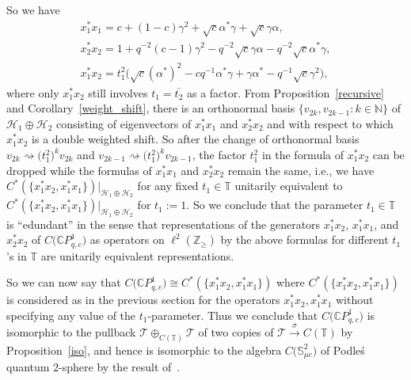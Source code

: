 So we have
\begin{gather*}
x_{1}^{\ast}x_{1} =c+(1-c) \gamma^{2}+\sqrt{c}\alpha^{\ast
}\gamma+\sqrt{c}\gamma\alpha,\\
x_{2}^{\ast}x_{2} =1+q^{-2}(c-1) \gamma^{2}-q^{-2}\sqrt
{c}\gamma\alpha-q^{-2}\sqrt{c}\alpha^{\ast}\gamma,\\
x_{1}^{\ast}x_{2} =t_{1}^{2}\big( \sqrt{c} ( \alpha^{\ast} )
^{2}-cq^{-1}\alpha^{\ast}\gamma+\gamma\alpha^{\ast}-q^{-1}\sqrt{c}\gamma
^{2}\big) ,
\end{gather*}
where only $x_{1}^{\ast}x_{2}$ still involves $t_{1}=\overline{t_{2}}$ as a
factor. From Proposition~\ref{recursive} and Corollary~\ref{weight_shift}, there is an orthonormal
basis $ \{ v_{2k},v_{2k-1}\colon k\in\mathbb{N} \} $ of $\mathcal{H}%
_{1}\oplus\mathcal{H}_{2}$ consisting of eigenvectors of $x_{1}^{\ast}x_{1}$
and $x_{2}^{\ast}x_{2}$ and with respect to which $x_{1}^{\ast}x_{2}$ is a
double weighted shift. So after the change of orthonormal basis $v_{2k}%
\rightsquigarrow\big( t_{1}^{2}\big) ^{k}v_{2k}$ and $v_{2k-1}%
\rightsquigarrow\big( t_{1}^{2}\big) ^{k}v_{2k-1}$, the factor $t_{1}%
^{2}$ in the formula of $x_{1}^{\ast}x_{2}$ can be dropped while the formulas
of $x_{1}^{\ast}x_{1}$ and $x_{2}^{\ast}x_{2}$ remain the same, i.e., we have
$C^{\ast} ( \{ x_{1}^{\ast}x_{2},x_{1}^{\ast}x_{1} \}
 ) |_{\mathcal{H}_{1}\oplus\mathcal{H}_{2}}$ for any fixed $t_{1}%
\in\mathbb{T}$ unitarily equivalent to $C^{\ast} ( \{ x_{1}^{\ast
}x_{2},x_{1}^{\ast}x_{1} \} ) |_{\mathcal{H}_{1}\oplus
\mathcal{H}_{2}}$ for $t_{1}:=1$. So we conclude that the parameter $t_{1}%
\in\mathbb{T}$ is ``edundant'' in the sense
that representations of the generators $x_{1}^{\ast}x_{2}$, $x_{1}^{\ast}%
x_{1}$, and $x_{2}^{\ast}x_{2}$ of $C\big( \mathbb{C}P_{q,c}^{1}\big) $
as operators on $\ell^{2} ( \mathbb{Z}_{\geq} ) $ by the above
formulas for different $t_{1}$'s in $\mathbb{T}$ are unitarily equivalent representations.

So we can now say that $C\big( \mathbb{C}P_{q,c}^{1}\big) \cong C^{\ast
}( \{ x_{1}^{\ast}x_{2},x_{1}^{\ast}x_{1}\} ) $
where $C^{\ast}( \{ x_{1}^{\ast}x_{2},x_{1}^{\ast}x_{1}\}
) $ is considered as in the previous section for the operators
$x_{1}^{\ast}x_{2},x_{1}^{\ast}x_{1}$ without specifying any value of the
$t_{1}$-parameter. Thus we conclude that $C\big( \mathbb{C}P_{q,c}^{1}\big) $ is isomorphic to the pullback $\mathcal{T}\oplus_{C(\mathbb{T}) }\mathcal{T}$ of two copies of $\mathcal{T}\overset{\sigma
}{\rightarrow}C(\mathbb{T}) $ by Proposition~\ref{iso}, and hence is
isomorphic to the algebra $C\big( \mathbb{S}_{\mu c}^{2}\big) $ of
Podle\'{s} quantum 2-sphere by the result of~\cite{Sh:qp}.

